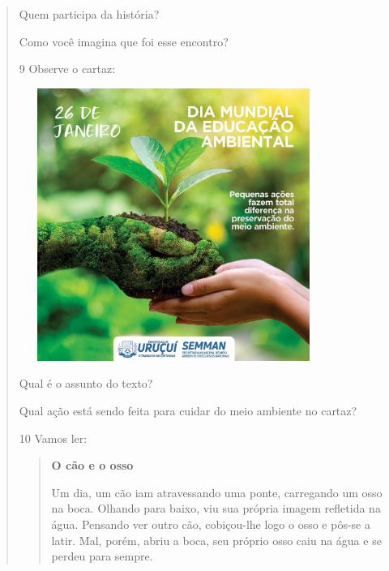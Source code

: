 \begin{verse}
\begin{escolha}

\item Quem participa da história?


\item Como você imagina que foi esse encontro? %

\end{escolha}

\num{9} Observe o cartaz:

\includegraphics[width=3.96154in,height=3.50028in]{media/image123.jpeg}


\begin{escolha}
\item Qual é o assunto do texto?


\item Qual ação está sendo feita para cuidar do meio ambiente no cartaz?

\end{escolha}

\num{10} Vamos ler:

\begin{quote}
\textbf{O cão e o osso}

Um dia, um cão iam atravessando uma ponte, carregando um osso na boca.
Olhando para baixo, viu sua própria imagem refletida
na água. Pensando ver outro cão, cobiçou-lhe logo o osso e
pôs-se a latir. Mal, porém, abriu a boca, seu próprio osso caiu
na água e se perdeu para sempre.
\end{quote}


\end{verse}

